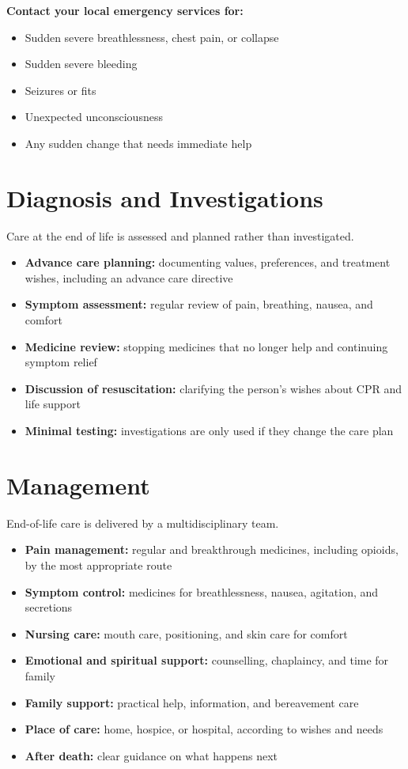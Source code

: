 \textbf{Contact your local emergency services for:}
\begin{itemize}
    \item Sudden severe breathlessness, chest pain, or collapse
    \item Sudden severe bleeding
    \item Seizures or fits
    \item Unexpected unconsciousness
    \item Any sudden change that needs immediate help
\end{itemize}

\section*{Diagnosis and Investigations}
Care at the end of life is assessed and planned rather than investigated.
\begin{itemize}
    \item \textbf{Advance care planning:} documenting values, preferences, and treatment wishes, including an advance care directive
    \item \textbf{Symptom assessment:} regular review of pain, breathing, nausea, and comfort
    \item \textbf{Medicine review:} stopping medicines that no longer help and continuing symptom relief
    \item \textbf{Discussion of resuscitation:} clarifying the person's wishes about CPR and life support
    \item \textbf{Minimal testing:} investigations are only used if they change the care plan
\end{itemize}

\section*{Management}
End-of-life care is delivered by a multidisciplinary team.
\begin{itemize}
    \item \textbf{Pain management:} regular and breakthrough medicines, including opioids, by the most appropriate route
    \item \textbf{Symptom control:} medicines for breathlessness, nausea, agitation, and secretions
    \item \textbf{Nursing care:} mouth care, positioning, and skin care for comfort
    \item \textbf{Emotional and spiritual support:} counselling, chaplaincy, and time for family
    \item \textbf{Family support:} practical help, information, and bereavement care
    \item \textbf{Place of care:} home, hospice, or hospital, according to wishes and needs
    \item \textbf{After death:} clear guidance on what happens next
\end{itemize}

